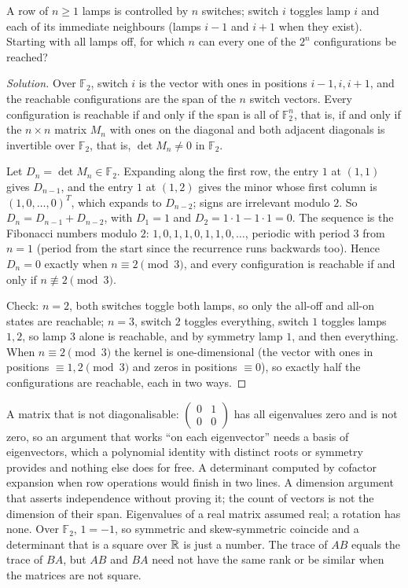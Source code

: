 \begin{example}
A row of $n\ge 1$ lamps is controlled by $n$ switches; switch $i$ toggles lamp $i$ and each of its immediate neighbours (lamps $i-1$ and $i+1$ when they exist). Starting with all lamps off, for which $n$ can every one of the $2^n$ configurations be reached?
\end{example}

\begin{proof}[Solution]
Over $\mathbb F_2$, switch $i$ is the vector with ones in positions $i-1,i,i+1$, and the reachable configurations are the span of the $n$ switch vectors. Every configuration is reachable if and only if the span is all of $\mathbb F_2^n$, that is, if and only if the $n\times n$ matrix $M_n$ with ones on the diagonal and both adjacent diagonals is invertible over $\mathbb F_2$, that is, $\det M_n\ne 0$ in $\mathbb F_2$.

Let $D_n=\det M_n\in\mathbb F_2$. Expanding along the first row, the entry $1$ at $(1,1)$ gives $D_{n-1}$, and the entry $1$ at $(1,2)$ gives the minor whose first column is $(1,0,\dots,0)^T$, which expands to $D_{n-2}$; signs are irrelevant modulo $2$. So $D_n=D_{n-1}+D_{n-2}$, with $D_1=1$ and $D_2=1\cdot1-1\cdot1=0$. The sequence is the Fibonacci numbers modulo $2$: $1,0,1,1,0,1,1,0,\dots$, periodic with period $3$ from $n=1$ (period from the start since the recurrence runs backwards too). Hence $D_n=0$ exactly when $n\equiv 2\pmod 3$, and every configuration is reachable if and only if $n\not\equiv 2\pmod 3$.

Check: $n=2$, both switches toggle both lamps, so only the all-off and all-on states are reachable; $n=3$, switch $2$ toggles everything, switch $1$ toggles lamps $1,2$, so lamp $3$ alone is reachable, and by symmetry lamp $1$, and then everything. When $n\equiv 2\pmod 3$ the kernel is one-dimensional (the vector with ones in positions $\equiv 1,2\pmod 3$ and zeros in positions $\equiv 0$), so exactly half the configurations are reachable, each in two ways.
\end{proof}

\begin{trap}
A matrix that is not diagonalisable: $\begin{pmatrix}0&1\\0&0\end{pmatrix}$ has all eigenvalues zero and is not zero, so an argument that works ``on each eigenvector'' needs a basis of eigenvectors, which a polynomial identity with distinct roots or symmetry provides and nothing else does for free. A determinant computed by cofactor expansion when row operations would finish in two lines. A dimension argument that asserts independence without proving it; the count of vectors is not the dimension of their span. Eigenvalues of a real matrix assumed real; a rotation has none. Over $\mathbb F_2$, $1=-1$, so symmetric and skew-symmetric coincide and a determinant that is a square over $\mathbb{R}$ is just a number. The trace of $AB$ equals the trace of $BA$, but $AB$ and $BA$ need not have the same rank or be similar when the matrices are not square.
\end{trap}


